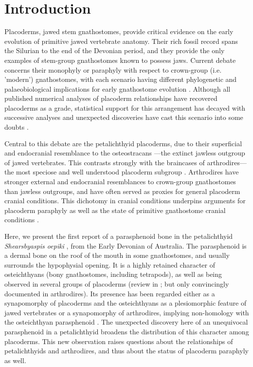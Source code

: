 \documentclass[11pt,letterpaper]{report}
\begin{document}
\section{Introduction}
Placoderms, jawed stem gnathostomes, provide critical evidence on the early evolution of primitive jawed vertebrate anatomy. Their rich fossil record spans the Silurian to the end of the Devonian period, and they provide the only examples of stem-group gnathostomes known to possess jaws. Current debate concerns their monophyly \citep{Goujet1984a,Goujet2001,Young1986,goujet2004placoderm} or paraphyly \citep{brazeau2009braincase,davis2012,zhu2013silurian} with respect to crown-group (i.e. 'modern') gnathostomes, with each scenario having different phylogenetic and palaeobiological implications for early gnathostome evolution \citep{zhu2013silurian,Dupret2014,long2015copulation}. Although all published numerical analyses of placoderm relationships have recovered placoderms as a grade, statistical support for this arrangement has decayed with successive analyses and unexpected discoveries have cast this scenario into some doubts \citep{long2009devonian,long2015copulation,brazeau2014characters,giles2015osteichthyan}.

Central to this debate are the petalichthyid placoderms, due to their superficial and endocranial resemblance to the osteostracans \citep{Janvier1996a,brazeau2009braincase,brazeau2014characters}—the extinct jawless outgroup of jawed vertebrates. This contrasts strongly with the braincases of arthrodires—the most speciose and well understood placoderm subgroup \citep{Stensi1963b,Stensi1969,Denison1978,Goujet1984a}. Arthrodires have stronger external and endocranial resemblances to crown-group gnathostomes than jawless outgroups, and have often served as proxies for general placoderm cranial conditions. This dichotomy in cranial conditions underpins arguments for placoderm paraphyly as well as the state of primitive gnathostome cranial conditions \citep{brazeau2014characters}.

Here, we present the first report of a parasphenoid bone in the petalichthyid \textit{Shearsbyaspis oepiki} \citealt{Young1985}, from the Early Devonian of Australia. The parasphenoid is a dermal bone on the roof of the mouth in some gnathostomes, and usually surrounds the hypophysial opening. It is a highly retained character of osteichthyans (bony gnathostomes, including tetrapods), as well as being observed in several groups of placoderms (review in \citealt{Dennis-Bryan1995}; but only convincingly documented in arthrodires). Its presence has been regarded either as a synapomorphy of placoderms and the osteichthyans \citep{Gardiner1984a,Gardiner1984b} as a plesiomorphic feature of jawed vertebrates \citep{Dennis-Bryan1995} or a synapomorphy of arthrodires, implying non-homology with the osteichthyan parasphenoid \citep{Young1986,Goujet2001}. The unexpected discovery here of an unequivocal parasphenoid in a petalichthyid broadens the distribution of this character among placoderms. This new observation raises questions about the relationships of petalichthyids and arthrodires, and thus about the status of placoderm paraphyly as well.
\end{document}
